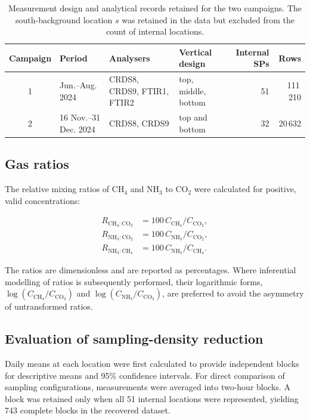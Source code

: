 \documentclass[12pt,a4paper]{article}
\begin{document}
\begin{table}[htbp]
\centering
\caption{Measurement design and analytical records retained for the two
campaigns. The south-background location \(s\) was retained in the data but
excluded from the count of internal locations.}
\label{tab:campaigns}
\begingroup
\small
\setlength{\tabcolsep}{1.5pt}
\begin{tabular}{@{}c l
  >{\raggedright\arraybackslash}p{4.0cm}
  >{\raggedright\arraybackslash}p{2.7cm}
  r r@{}}
\toprule
Campaign & Period & Analysers & Vertical design & Internal SPs & Rows\\
\midrule
1 & Jun.--Aug. 2024 & CRDS8, CRDS9, FTIR1, FTIR2 &
top, middle, bottom & 51 & 111\,210\\
2 & 16 Nov.--31 Dec. 2024 & CRDS8, CRDS9 &
top and bottom & 32 & 20\,632\\
\bottomrule
\end{tabular}
\endgroup
\end{table}

\subsection{Gas ratios}

The relative mixing ratios of \(\mathrm{CH_4}\) and \(\mathrm{NH_3}\) to
\(\mathrm{CO_2}\) were calculated for positive, valid concentrations:

\begin{align}
R_{\mathrm{CH_4:CO_2}} &=
100\,C_{\mathrm{CH_4}}/C_{\mathrm{CO_2}},\\
R_{\mathrm{NH_3:CO_2}} &=
100\,C_{\mathrm{NH_3}}/C_{\mathrm{CO_2}},\\
R_{\mathrm{NH_3:CH_4}} &=
100\,C_{\mathrm{NH_3}}/C_{\mathrm{CH_4}}.
\end{align}

The ratios are dimensionless and are reported as percentages. Where
inferential modelling of ratios is subsequently performed, their logarithmic
forms, \(\log(C_{\mathrm{CH_4}}/C_{\mathrm{CO_2}})\) and
\(\log(C_{\mathrm{NH_3}}/C_{\mathrm{CO_2}})\), are preferred to avoid the
asymmetry of untransformed ratios.

\subsection{Evaluation of sampling-density reduction}

Daily means at each location were first calculated to provide independent
blocks for descriptive means and 95\% confidence intervals. For direct
comparison of sampling configurations, measurements were averaged into
two-hour blocks. A block was retained only when all 51 internal locations
were represented, yielding 743 complete blocks in the recovered dataset.
\end{document}
